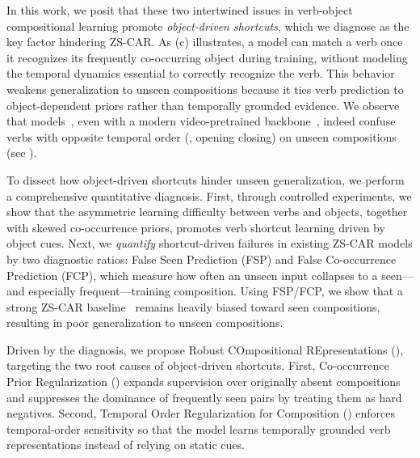 In this work, we posit that these two intertwined issues in verb-object compositional learning promote \emph{object-driven shortcuts}, which we diagnose as the key factor hindering ZS-CAR.
As  (c) illustrates, a model can match a verb once it recognizes its frequently co-occurring object during training, without modeling the temporal dynamics essential to correctly recognize the verb.
This behavior weakens generalization to unseen compositions because it ties verb prediction to object-dependent priors rather than temporally grounded evidence.
We observe that models~\cite{li2024c2c}, even with a modern video-pretrained backbone~\cite{wang2024iv2}, indeed confuse verbs with opposite temporal order (\eg, opening \vs closing) on unseen compositions (see ).









To dissect how object-driven shortcuts hinder unseen generalization, we perform a comprehensive quantitative diagnosis. 
First, through controlled experiments, we show that the asymmetric learning difficulty between verbs and objects, together with skewed co-occurrence priors, promotes verb shortcut learning driven by object cues.
Next, we \emph{quantify} shortcut-driven failures in existing ZS-CAR models by two diagnostic ratios: False Seen Prediction (FSP) and False Co-occurrence Prediction (FCP), which measure how often an unseen input collapses to a seen—and especially frequent—training composition.
Using FSP/FCP, we show that a strong ZS-CAR baseline~\cite{li2024c2c} remains heavily biased toward seen compositions, resulting in poor generalization to unseen compositions.

Driven by the diagnosis, we propose Robust COmpositional REpresentations (\ours{}), targeting the two root causes of object-driven shortcuts.
First, Co-occurrence Prior Regularization (\cpr{}) expands supervision over originally absent compositions and suppresses the dominance of frequently seen pairs by treating them as hard negatives.
Second, Temporal Order Regularization for Composition (\torc{}) enforces temporal-order sensitivity so that the model learns temporally grounded verb representations instead of relying on static cues.















